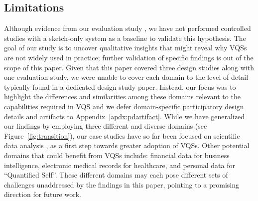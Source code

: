  \subsection{Limitations}%
 \par Although evidence from our evaluation study , we have not performed controlled studies
 with a sketch-only system as a baseline to validate this hypothesis. The goal of our study is to uncover qualitative insights that might reveal why VQSs are not widely used in practice; further validation of specific findings is out of the scope of this paper.  Given that this paper covered three design studies along with one evaluation study, we were unable to cover each domain to the level of detail typically found in a dedicated design study paper. Instead, our focus was to highlight the differences and similarities among these domains relevant to the capabilities required in VQS and we defer domain-specific participatory design details and artifacts to Appendix~\ref{apdx:pdartifact}. While we have generalized our findings by employing
 three different and diverse domains (see Figure~\ref{fig:transition}),
 our case studies have so far
 been focused on scientific data analysis ,
 as a first step towards greater adoption of VQSs.
 Other potential domains that could benefit from VQSs include:
 financial data for business intelligence,
 electronic medical records for healthcare,
 and personal data for ``Quantified Self''.
 These different domains may each pose different sets of challenges  unaddressed by the findings in this paper,
  pointing to a promising direction for future work.